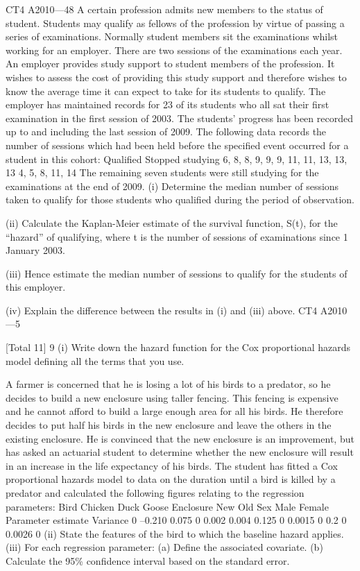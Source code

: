 CT4 A2010—48
A certain profession admits new members to the status of student. Students may
qualify as fellows of the profession by virtue of passing a series of examinations.
Normally student members sit the examinations whilst working for an employer.
There are two sessions of the examinations each year.
An employer provides study support to student members of the profession. It wishes
to assess the cost of providing this study support and therefore wishes to know the
average time it can expect to take for its students to qualify.
The employer has maintained records for 23 of its students who all sat their first
examination in the first session of 2003. The students’ progress has been recorded up
to and including the last session of 2009. The following data records the number of
sessions which had been held before the specified event occurred for a student in this
cohort:
Qualified
Stopped studying
6, 8, 8, 9, 9, 9, 11, 11, 13, 13, 13
4, 5, 8, 11, 14
The remaining seven students were still studying for the examinations at the end of
2009.
(i) Determine the median number of sessions taken to qualify for those students
who qualified during the period of observation.
 
(ii) Calculate the Kaplan-Meier estimate of the survival function, S(t), for the
“hazard” of qualifying, where t is the number of sessions of examinations
since 1 January 2003.
 
(iii) Hence estimate the median number of sessions to qualify for the students of
this employer.
 
(iv) Explain the difference between the results in (i) and (iii) above.
CT4 A2010—5
 
[Total 11]
9
(i)
Write down the hazard function for the Cox proportional hazards
model defining all the terms that you use.
 
A farmer is concerned that he is losing a lot of his birds to a predator, so he decides to
build a new enclosure using taller fencing. This fencing is expensive and he cannot
afford to build a large enough area for all his birds. He therefore decides to put half
his birds in the new enclosure and leave the others in the existing enclosure. He is
convinced that the new enclosure is an improvement, but has asked an actuarial
student to determine whether the new enclosure will result in an increase in the life
expectancy of his birds. The student has fitted a Cox proportional hazards model to
data on the duration until a bird is killed by a predator and calculated the following
figures relating to the regression parameters:
Bird Chicken
Duck
Goose
Enclosure New
Old
Sex Male
Female
Parameter estimate Variance
0
–0.210
0.075 0
0.002
0.004
0.125
0 0.0015
0
0.2
0 0.0026
0
(ii) State the features of the bird to which the baseline hazard applies.
(iii) For each regression parameter:
(a) Define the associated covariate.
(b) Calculate the 95\% confidence interval based on the standard error.
 

